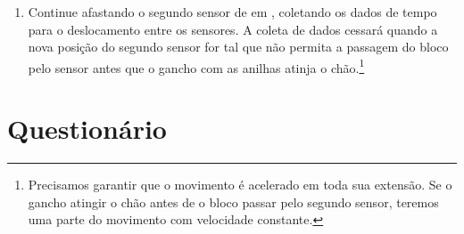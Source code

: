 \begin{enumerate}
    \item Continue afastando o segundo sensor de  em , coletando os dados de tempo para o deslocamento entre os sensores. A coleta de dados cessará quando a nova posição do segundo sensor for tal que não permita a passagem do bloco pelo sensor antes que o gancho com as anilhas atinja o chão.\footnote{Precisamos garantir que o movimento é acelerado em toda sua extensão. Se o gancho atingir o chão antes de o bloco passar pelo segundo sensor, teremos uma parte do movimento com velocidade constante.}
\end{enumerate}

\cleardoublepage


\vspace{15mm}

\begin{fullwidth}
\noindent{}
\vspace{5mm}

\noindent{}

\noindent{}

\noindent{}

\noindent{}

\noindent{}
\end{fullwidth}

\vspace{5mm}

\section{Questionário}

